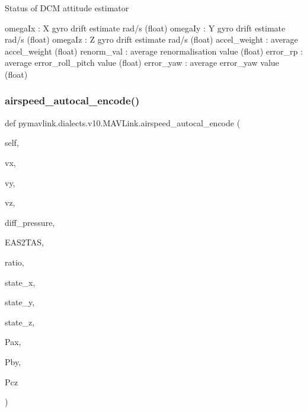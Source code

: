 \begin{DoxyVerb}Status of DCM attitude estimator

omegaIx                   : X gyro drift estimate rad/s (float)
omegaIy                   : Y gyro drift estimate rad/s (float)
omegaIz                   : Z gyro drift estimate rad/s (float)
accel_weight              : average accel_weight (float)
renorm_val                : average renormalisation value (float)
error_rp                  : average error_roll_pitch value (float)
error_yaw                 : average error_yaw value (float)\end{DoxyVerb}
 \mbox{\label{classpymavlink_1_1dialects_1_1v10_1_1MAVLink_ab2dc0690decc76930c508416314a37e3}} 
\subsubsection{\texorpdfstring{airspeed\+\_\+autocal\+\_\+encode()}{airspeed\_autocal\_encode()}}
{\footnotesize\ttfamily def pymavlink.\+dialects.\+v10.\+M\+A\+V\+Link.\+airspeed\+\_\+autocal\+\_\+encode (\begin{DoxyParamCaption}\item[{}]{self,  }\item[{}]{vx,  }\item[{}]{vy,  }\item[{}]{vz,  }\item[{}]{diff\+\_\+pressure,  }\item[{}]{E\+A\+S2\+T\+AS,  }\item[{}]{ratio,  }\item[{}]{state\+\_\+x,  }\item[{}]{state\+\_\+y,  }\item[{}]{state\+\_\+z,  }\item[{}]{Pax,  }\item[{}]{Pby,  }\item[{}]{Pcz }\end{DoxyParamCaption})}

